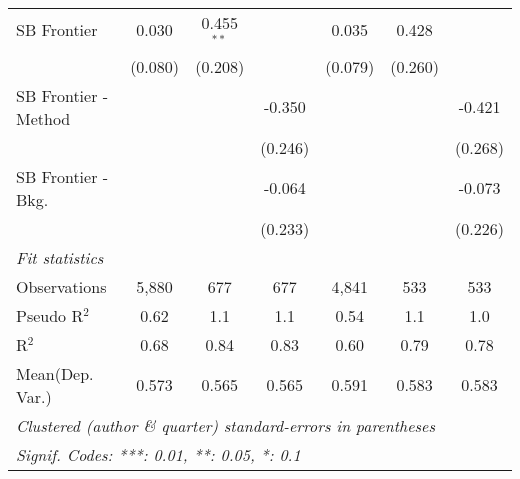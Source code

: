 \begin{tabular}{lcccccc}
   SB Frontier          & 0.030   & 0.455$^{**}$ &         & 0.035   & 0.428        &   \\   
                        & (0.080) & (0.208)      &         & (0.079) & (0.260)      &   \\   
   SB Frontier - Method &         &              & -0.350  &         &              & -0.421\\   
                        &         &              & (0.246) &         &              & (0.268)\\   
   SB Frontier - Bkg.   &         &              & -0.064  &         &              & -0.073\\   
                        &         &              & (0.233) &         &              & (0.226)\\   
   \midrule
   \emph{Fit statistics}\\
   Observations         & 5,880   & 677          & 677     & 4,841   & 533          & 533\\  
   Pseudo R$^2$         & 0.62    & 1.1          & 1.1     & 0.54    & 1.1          & 1.0\\  
   R$^2$                & 0.68    & 0.84         & 0.83    & 0.60    & 0.79         & 0.78\\  
Mean(Dep. Var.) & 0.573 & 0.565 & 0.565 & 0.591 & 0.583 & 0.583 \\
   \midrule \midrule
   \multicolumn{7}{l}{\emph{Clustered (author \& quarter) standard-errors in parentheses}}\\
   \multicolumn{7}{l}{\emph{Signif. Codes: ***: 0.01, **: 0.05, *: 0.1}}\\
\end{tabular}
\par\endgroup
